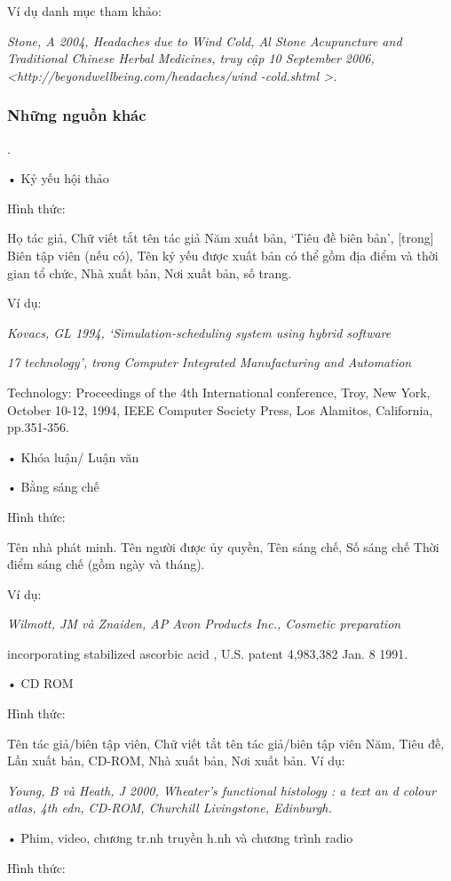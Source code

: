 \documentclass{hcmutarticle}
\begin{document}
Ví dụ danh mục tham khảo:

{\em Stone, A 2004, Headaches due to Wind Cold, Al Stone Acupuncture and Traditional Chinese Herbal Medicines, truy cập 10 September 2006,  <http://beyondwellbeing.com/headaches/wind -cold.shtml >.}


\subsubsection{	Những nguồn khác}.

•	Kỷ yếu hội thảo

Hình thức:

Họ tác giả, Chữ viết tắt tên tác giả Năm xuất bản, ‘Tiêu đề biên bản’, [trong] Biên tập viên (nếu có), Tên kỷ yếu được xuất bản có thể gồm địa điểm và thời gian tổ chức, Nhà xuất bản, Nơi xuất bản, số trang.


Ví dụ:

{\em Kovacs, GL 1994, ‘Simulation-scheduling system using hybrid software}

{\em 17 technology’, trong Computer Integrated Manufacturing and Automation

Technology: Proceedings of the 4th International conference, Troy, New York, October 10-12, 1994, IEEE Computer Society Press, Los Alamitos, California, pp.351-356.}

•	Khóa luận/ Luận văn

•	Bằng sáng chế

Hình thức:

Tên nhà phát minh. Tên người được ủy quyền, Tên sáng chế, Số sáng chế Thời điểm sáng chế (gồm ngày và tháng).

Ví dụ:

{\em Wilmott, JM và Znaiden, AP Avon Products Inc., Cosmetic preparation

incorporating stabilized ascorbic acid , U.S. patent 4,983,382 Jan. 8 1991.}

•	CD ROM

Hình thức:

Tên tác giả/biên tập viên, Chữ viết tắt tên tác giả/biên tập viên Năm, Tiêu đề, Lần xuất bản, CD-ROM, Nhà xuất bản, Nơi xuất bản.
Ví dụ:


{\em Young, B và Heath, J 2000, Wheater's functional histology : a text an d colour atlas, 4th edn, CD-ROM, Churchill Livingstone, Edinburgh.}

•	Phim, video, chương tr.nh truyền h.nh và chương trình radio

Hình thức:
\end{document}
